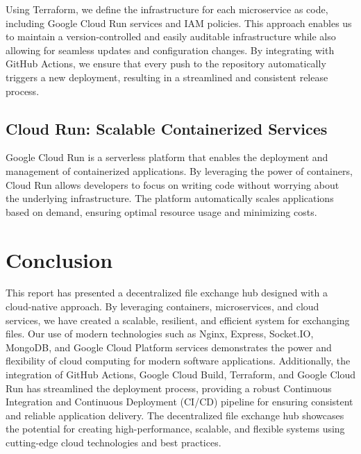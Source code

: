 \documentclass[a4paper,fleqn]{cas-dc}
\begin{document}
Using Terraform, we define the infrastructure for each microservice as code, including Google Cloud Run services and IAM policies. This approach enables us to maintain a version-controlled and easily auditable infrastructure while also allowing for seamless updates and configuration changes. By integrating with GitHub Actions, we ensure that every push to the repository automatically triggers a new deployment, resulting in a streamlined and consistent release process.

\subsection{Cloud Run: Scalable Containerized Services}

Google Cloud Run is a serverless platform that enables the deployment and management of containerized applications. By leveraging the power of containers, Cloud Run allows developers to focus on writing code without worrying about the underlying infrastructure. The platform automatically scales applications based on demand, ensuring optimal resource usage and minimizing costs.

\section{Conclusion}

This report has presented a decentralized file exchange hub designed with a cloud-native approach. By leveraging containers, microservices, and cloud services, we have created a scalable, resilient, and efficient system for exchanging files. Our use of modern technologies such as Nginx, Express, Socket.IO, MongoDB, and Google Cloud Platform services demonstrates the power and flexibility of cloud computing for modern software applications. Additionally, the integration of GitHub Actions, Google Cloud Build, Terraform, and Google Cloud Run has streamlined the deployment process, providing a robust Continuous Integration and Continuous Deployment (CI/CD) pipeline for ensuring consistent and reliable application delivery. The decentralized file exchange hub showcases the potential for creating high-performance, scalable, and flexible systems using cutting-edge cloud technologies and best practices.

%
%
%


\end{document}
